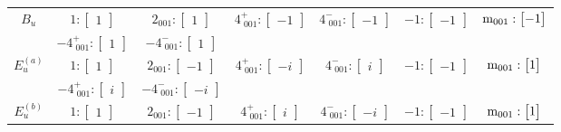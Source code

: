 \documentclass[fleqn,8pt,landscape]{jsarticle}
\begin{document}
\begin{longtable}{ccccccc}
$ B_{u} $ & $ 1:\begin{bmatrix} 1 \end{bmatrix} $ & $ 2{}_{001}:\begin{bmatrix} 1 \end{bmatrix} $ & $ 4^{+}_{\,\,001}:\begin{bmatrix} -1 \end{bmatrix} $ & $ 4^{-}_{\,\,001}:\begin{bmatrix} -1 \end{bmatrix} $ & $ -1:\begin{bmatrix} -1 \end{bmatrix} $ & $ {\rm m}_{001}:\begin{bmatrix} -1 \end{bmatrix} $ \\
& $ -4^{+}_{\,\,001}:\begin{bmatrix} 1 \end{bmatrix} $ & $ -4^{-}_{\,\,001}:\begin{bmatrix} 1 \end{bmatrix} $ & $  $ & $  $ & $  $ & $  $ \\ \hline
$ E_{u}^{(a)} $ & $ 1:\begin{bmatrix} 1 \end{bmatrix} $ & $ 2{}_{001}:\begin{bmatrix} -1 \end{bmatrix} $ & $ 4^{+}_{\,\,001}:\begin{bmatrix} - i \end{bmatrix} $ & $ 4^{-}_{\,\,001}:\begin{bmatrix} i \end{bmatrix} $ & $ -1:\begin{bmatrix} -1 \end{bmatrix} $ & $ {\rm m}_{001}:\begin{bmatrix} 1 \end{bmatrix} $ \\
& $ -4^{+}_{\,\,001}:\begin{bmatrix} i \end{bmatrix} $ & $ -4^{-}_{\,\,001}:\begin{bmatrix} - i \end{bmatrix} $ & $  $ & $  $ & $  $ & $  $ \\ \hline
$ E_{u}^{(b)} $ & $ 1:\begin{bmatrix} 1 \end{bmatrix} $ & $ 2{}_{001}:\begin{bmatrix} -1 \end{bmatrix} $ & $ 4^{+}_{\,\,001}:\begin{bmatrix} i \end{bmatrix} $ & $ 4^{-}_{\,\,001}:\begin{bmatrix} - i \end{bmatrix} $ & $ -1:\begin{bmatrix} -1 \end{bmatrix} $ & $ {\rm m}_{001}:\begin{bmatrix} 1 \end{bmatrix} $ \\

\end{longtable}
\end{document}
